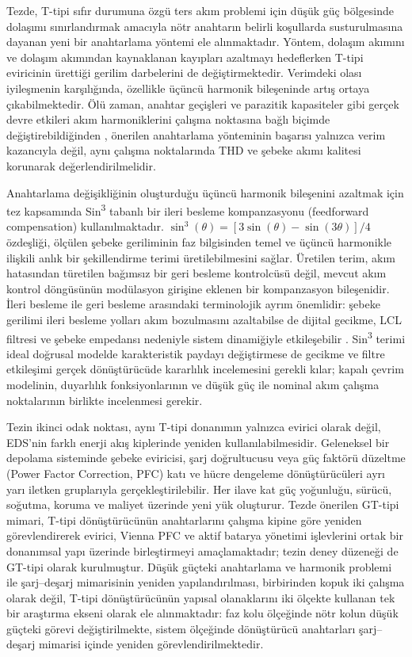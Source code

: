 Tezde, T-tipi sıfır durumuna özgü ters akım problemi için düşük güç bölgesinde dolaşımı sınırlandırmak amacıyla nötr anahtarın belirli koşullarda susturulmasına dayanan yeni bir anahtarlama yöntemi ele alınmaktadır. Yöntem, dolaşım akımını ve dolaşım akımından kaynaklanan kayıpları azaltmayı hedeflerken T-tipi eviricinin ürettiği gerilim darbelerini de değiştirmektedir. Verimdeki olası iyileşmenin karşılığında, özellikle üçüncü harmonik bileşeninde artış ortaya çıkabilmektedir. Ölü zaman, anahtar geçişleri ve parazitik kapasiteler gibi gerçek devre etkileri akım harmoniklerini çalışma noktasına bağlı biçimde değiştirebildiğinden \citep{Zhang2014Deadtime}, önerilen anahtarlama yönteminin başarısı yalnızca verim kazancıyla değil, aynı çalışma noktalarında THD ve şebeke akımı kalitesi korunarak değerlendirilmelidir.

Anahtarlama değişikliğinin oluşturduğu üçüncü harmonik bileşenini azaltmak için tez kapsamında Sin\textsuperscript{3} tabanlı bir ileri besleme kompanzasyonu (feedforward compensation) kullanılmaktadır. $\sin^3(\theta)=[3\sin(\theta)-\sin(3\theta)]/4$ özdeşliği, ölçülen şebeke geriliminin faz bilgisinden temel ve üçüncü harmonikle ilişkili anlık bir şekillendirme terimi üretilebilmesini sağlar. Üretilen terim, akım hatasından türetilen bağımsız bir geri besleme kontrolcüsü değil, mevcut akım kontrol döngüsünün modülasyon girişine eklenen bir kompanzasyon bileşenidir. İleri besleme ile geri besleme arasındaki terminolojik ayrım önemlidir: şebeke gerilimi ileri besleme yolları akım bozulmasını azaltabilse de dijital gecikme, LCL filtresi ve şebeke empedansı nedeniyle sistem dinamiğiyle etkileşebilir \citep{Lu2016,Wang2024}. Sin\textsuperscript{3} terimi ideal doğrusal modelde karakteristik paydayı değiştirmese de gecikme ve filtre etkileşimi gerçek dönüştürücüde kararlılık incelemesini gerekli kılar; kapalı çevrim modelinin, duyarlılık fonksiyonlarının ve düşük güç ile nominal akım çalışma noktalarının birlikte incelenmesi gerekir.

Tezin ikinci odak noktası, aynı T-tipi donanımın yalnızca evirici olarak değil, EDS'nin farklı enerji akış kiplerinde yeniden kullanılabilmesidir. Geleneksel bir depolama sisteminde şebeke eviricisi, şarj doğrultucusu veya güç faktörü düzeltme (Power Factor Correction, PFC) katı ve hücre dengeleme dönüştürücüleri ayrı yarı iletken gruplarıyla gerçekleştirilebilir. Her ilave kat güç yoğunluğu, sürücü, soğutma, koruma ve maliyet üzerinde yeni yük oluşturur. Tezde önerilen GT-tipi mimari, T-tipi dönüştürücünün anahtarlarını çalışma kipine göre yeniden görevlendirerek evirici, Vienna PFC ve aktif batarya yönetimi işlevlerini ortak bir donanımsal yapı üzerinde birleştirmeyi amaçlamaktadır; tezin deney düzeneği de GT-tipi olarak kurulmuştur. Düşük güçteki anahtarlama ve harmonik problemi ile şarj--deşarj mimarisinin yeniden yapılandırılması, birbirinden kopuk iki çalışma olarak değil, T-tipi dönüştürücünün yapısal olanaklarını iki ölçekte kullanan tek bir araştırma ekseni olarak ele alınmaktadır: faz kolu ölçeğinde nötr kolun düşük güçteki görevi değiştirilmekte, sistem ölçeğinde dönüştürücü anahtarları şarj--deşarj mimarisi içinde yeniden görevlendirilmektedir.

